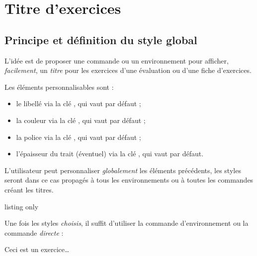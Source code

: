 \documentclass[french,11pt,a4paper]{article}
\begin{document}
\pagebreak

\section{Titre d'exercices}

\subsection{Principe et définition du style global}

L'idée est de proposer une commande ou un environnement pour afficher, \textit{facilement}, un \textit{titre} pour les exercices d'une évaluation ou d'une fiche d'exercices.

\smallskip

Les éléments personnalisables sont :

\begin{itemize}
	\item le libellé via la clé \MontreCode{[Libelle]}, qui vaut  par défaut ;
	\item la couleur via la clé \MontreCode{[Couleur]}, qui vaut  par défaut ;
	\item la police via la clé \MontreCode{[Police]}, qui vaut  par défaut ;
	\item l'épaisseur du trait (éventuel) via la clé \MontreCode{[EpTrait]}, qui vaut \MontreCode{1.1pt} par défaut.
\end{itemize}

L'utilisateur peut personnaliser \textit{globalement} les éléments précédents, les styles seront dans ce cas propagés à tous les environnements ou à toutes les commandes créant les titres.

\begin{DemoCode}{listing only}
\StyleEnvtExo[clés]

\StyleEnvtExoDefaut
\end{DemoCode}

Une fois les styles \textit{choisis}, il suffit d'utiliser la commande d'environnement ou la commande \textit{directe} :

\begin{DemoCode}{}
\begin{EnvtExo}
Ceci est un exercice\ldots
\end{EnvtExo}
\end{DemoCode}
\end{document}
